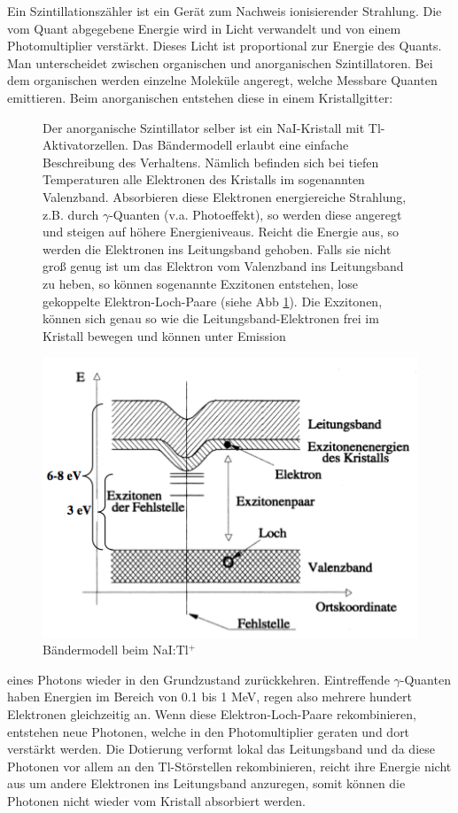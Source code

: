 Ein Szintillationszähler ist ein Gerät zum Nachweis ionisierender Strahlung. Die vom Quant abgegebene Energie wird in Licht verwandelt und von einem Photomultiplier verstärkt. Dieses Licht ist proportional zur Energie des Quants. Man unterscheidet zwischen organischen und anorganischen Szintillatoren. Bei dem organischen werden einzelne Moleküle angeregt, welche Messbare Quanten emittieren. Beim anorganischen entstehen diese in einem Kristallgitter:

\begin{figure}[H]
	\begin{minipage}{0.45\textwidth}
	Der anorganische Szintillator selber ist ein NaI-Kristall mit Tl-Aktivatorzellen. Das Bändermodell erlaubt eine einfache Beschreibung des Verhaltens. Nämlich befinden sich bei tiefen Temperaturen alle Elektronen des Kristalls im sogenannten Valenzband. Absorbieren diese Elektronen energiereiche Strahlung, z.B. durch $\gamma$-Quanten (v.a. Photoeffekt), so werden diese angeregt und steigen auf höhere Energieniveaus. Reicht die Energie aus, so werden die Elektronen ins Leitungsband gehoben. Falls sie nicht groß genug ist um das Elektron vom Valenzband ins Leitungsband zu heben, so können sogenannte Exzitonen entstehen, lose gekoppelte Elektron-Loch-Paare (siehe Abb \ref{baendermodellszinti}). Die Exzitonen, können sich genau so wie die Leitungsband-Elektronen frei im Kristall bewegen und können unter Emission 
	\end{minipage}
	\begin{minipage}{0.54\textwidth}
	\centering \includegraphics[width=\textwidth]{Bilder/Bandmodell.png}
	\caption{Bändermodell beim NaI:Tl$^+$}
	\label{baendermodellszinti}
	\end{minipage}
\end{figure}
eines Photons wieder in den Grundzustand zurückkehren. Eintreffende $\gamma$-Quanten haben Energien im Bereich von 0.1 bis 1 MeV, regen also mehrere hundert Elektronen gleichzeitig an. Wenn diese Elektron-Loch-Paare rekombinieren, entstehen neue Photonen, welche in den Photomultiplier geraten und dort verstärkt werden. Die Dotierung verformt lokal das Leitungsband und da diese Photonen vor allem an den Tl-Störstellen rekombinieren, reicht ihre Energie nicht aus um andere Elektronen ins Leitungsband anzuregen, somit können die Photonen nicht wieder vom Kristall absorbiert werden.

